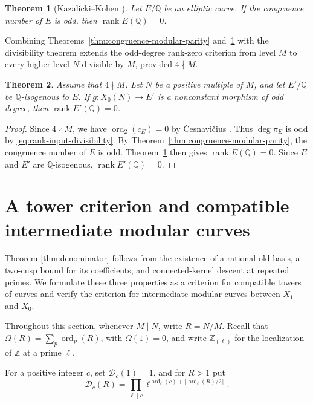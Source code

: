 \documentclass[12pt, letterpaper]{amsart}
\newtheorem{theorem}{Theorem}[section]
\theoremstyle{definition}
\theoremstyle{remark}
\newcommand{\Q}{\mathbb Q}
\newcommand{\Z}{\mathbb Z}
\DeclareMathOperator{\ord}{ord}
\numberwithin{equation}{section}
\begin{document}
\begin{theorem}[Kazalicki--Kohen \cite{KazalickiKohenCorrigendum}]
\label{thm:kazalicki-kohen-rank-zero}
Let \(E/\Q\) be an elliptic curve. If the congruence number of \(E\) is
odd, then \(\operatorname{rank}E(\Q)=0\).
\end{theorem}

Combining Theorems~\ref{thm:congruence-modular-parity}
and~\ref{thm:kazalicki-kohen-rank-zero} with the divisibility theorem
extends the odd-degree rank-zero criterion from level \(M\) to every higher
level \(N\) divisible by \(M\), provided \(4\nmid M\).

\begin{theorem}\label{thm:odd-degree-rank-zero}
Assume that \(4\nmid M\). Let \(N\) be a positive multiple of \(M\), and let
\(E'/\Q\) be \(\Q\)-isogenous to \(E\). If
\(g:X_0(N)\to E'\) is a nonconstant morphism of odd degree, then
\(\operatorname{rank}E'(\Q)=0\).
\end{theorem}

\begin{proof}
Since \(4\nmid M\), we have \(\ord_2(c_E)=0\) by
\v{C}esnavi\v{c}ius \cite[Theorem~1.2]{CesnaviciusManinSemistable}.
Thus \(\deg\pi_E\) is odd by \eqref{eq:rank-input-divisibility}.
By Theorem~\ref{thm:congruence-modular-parity}, the congruence number of \(E\)
is odd. Theorem~\ref{thm:kazalicki-kohen-rank-zero} then gives
\(\operatorname{rank}E(\Q)=0\). Since \(E\) and \(E'\) are \(\Q\)-isogenous,
\(\operatorname{rank}E'(\Q)=0\).
\end{proof}

\section{A tower criterion and compatible intermediate modular curves}\label{sec:tower-intermediate}

Theorem \ref{thm:denominator} follows from the existence of a rational
old basis, a two-cusp bound for its coefficients, and connected-kernel descent
at repeated primes. We formulate these three properties as a criterion for
compatible towers of curves and verify the criterion for
intermediate modular curves between \(X_1\) and \(X_0\).

Throughout this section, whenever \(M\mid N\), write \(R=N/M\). Recall that
\(\Omega(R)=\sum_p\ord_p(R)\), with \(\Omega(1)=0\), and write
\(\Z_{(\ell)}\) for the localization of \(\Z\) at a prime \(\ell\).

For a positive integer \(c\), set \(\mathcal D_c(1)=1\), and for \(R>1\) put
\begin{equation}\label{eq:sharp-D-definition}
        \mathcal D_c(R)
        =
        \prod_{\ell\mid c}
        \ell^{\ord_\ell(c)+\lfloor\ord_\ell(R)/2\rfloor}.
\end{equation}
\end{document}

